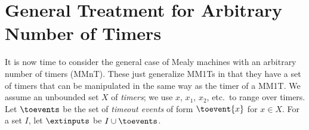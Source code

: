 \newcommand{\acttimers}{\mathit{active}}
\newcommand{\constrof}[1]{\phi_{#1}}
\newcommand{\post}{\mathit{post}}

\newcommand{\ctimers}{X}
\newcommand{\normalize}{\gamma}
\newcommand{\normalizeof}[2]{\normalize_{#2}^{#1}}
\newcommand{\timerbij}{\gamma}
\newcommand{\timerequiv}{\pi}
\newcommand{\extendedby}{\lhd}
\newcommand{\uttrace}{\textsf{tr}}
\newcommand{\uttraceof}[1]{\uttrace(#1)}
\newcommand{\uttracesof}[1]{\textsf{Tr}(#1)}
\newcommand{\strace}{\textsf{tr}_s}
\newcommand{\ssuffix}{v_s}
\newcommand{\suftraces}{\textsf{Tr}_s}
\newcommand{\pinpof}[1]{\textit{inp}_p(#1)}
\newcommand{\sinpof}[1]{\textit{inp}_s(#1)}
\newcommand{\symbinpof}[1]{\textit{symbinp}(#1)}
\newcommand{\word}{w}
\newcommand{\smap}{{\cal O}}
\newcommand{\smappre}{{\cal O_p}}
\newcommand{\smapsuf}{{\cal O_s}}
\newcommand{\obspre}{{\cal O_U}}

\section{General Treatment for Arbitrary Number of Timers}

It is now time to consider the general case of
Mealy machines with an arbitrary number of timers (MMnT). 
These just generalize MM1Ts in that they have a set of timers that
can be manipulated in the same way as the timer of a MM1T.
We assume an unbounded set $X$ of {\em timers};
we use $x$, $x_1$, $x_2$, etc.\ to range over timers.
Let $\toevents$ be the set of {\em timeout events} of form
$\toevent{x}$ for $x \in X$.
For a set $I$, let $\extinputs$ be $I \cup \toevents$.

